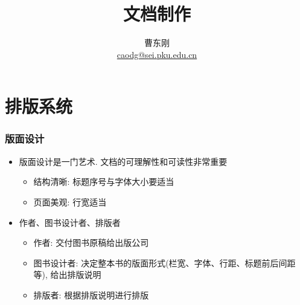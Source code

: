 \documentclass[compress]{beamer}
\begin{document}
					
\title{文档制作}

\author[\href{http://c.pku.edu.cn/}{http://c.pku.edu.cn/}]
{曹东刚\\\href{mailto:caodg@sei.pku.edu.cn}{caodg@sei.pku.edu.cn}}


\date{}


\begin{frame}
	\titlepage
\end{frame}

\section{排版系统}

\begin{frame}
\frametitle{版面设计}
\begin{itemize}
\item 版面设计是一门艺术. 文档的可理解性和可读性非常重要
    \begin{itemize}
      \item 结构清晰: 标题序号与字体大小要适当
      \item 页面美观: 行宽适当
    \end{itemize}

\item 作者、图书设计者、排版者
    \begin{itemize}
      \item 作者: 交付图书原稿给出版公司
      \item 图书设计者: 决定整本书的版面形式(栏宽、字体、行距、标题前后间距等), 给出排版说明
      \item 排版者: 根据排版说明进行排版
    \end{itemize}

\end{itemize}

\end{frame}
\end{document}
